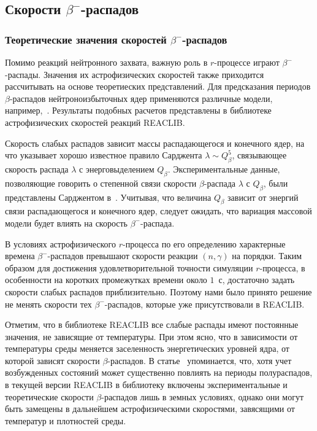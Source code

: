 \subsection{Скорости $\beta^-$-распадов} \label{sec:weakfit}
\subsubsection{Теоретические значения скоростей $\beta^-$-распадов}
  Помимо реакций нейтронного захвата, важную роль в $r$-процессе играют $\beta^-$-распады. Значения их астрофизических скоростей также приходится рассчитывать на основе теоретиеских представлений. Для предсказания периодов $\beta$-распадов нейтроноизбыточных ядер применяются различные модели, например,~\cite{moller2003}. Результаты подобных расчетов представлены в библиотеке астрофизических скоростей реакций REACLIB. 

  Скорость слабых распадов зависит массы распадающегося и конечного ядер, на что указывает хорошо известное правило Сарджента $\lambda \sim Q_\beta^5$, связывающее скорость распада $\lambda$ с энерговыделением $Q_\beta$. Экспериментальные данные, позволяющие говорить о степенной связи скорости $\beta$-распада $\lambda$ с $Q_\beta$, были представлены Сарджентом в~\cite{sargent1933}. Учитывая, что величина $Q_\beta$ зависит от энергий связи распадающегося и конечного ядер, следует ожидать, что вариация массовой модели будет влиять на скорость $\beta^-$-распада.

  В условиях астрофизического $r$-процесса по его определению характерные времена $\beta^-$-распадов превышают скорости реакции $(n,\gamma)$ на порядки. Таким образом для достижения удовлетворительной точности симуляции $r$-процесса, в особенности на коротких промежутках времени около $1$~с, достаточно задать скорости слабых распадов приблизительно. Поэтому нами было принято решение не менять скорости тех $\beta^-$-распадов, которые уже присутствовали в REACLIB.

  Отметим, что в библиотеке REACLIB все слабые распады имеют постоянные значения, не зависящие от температуры. При этом ясно, что в зависимости от температуры среды меняется заселенность энергетических уровней ядра, от которой зависят скорости $\beta$-распадов. В статье~\cite{reaclib2010} упоминается, что, хотя учет возбужденных состояний может существенно повлиять на периоды полураспадов, в текущей версии REACLIB в библиотеку включены экспериментальные и теоретические скорости $\beta$-распадов лишь в земных условиях, однако они могут быть замещены в дальнейшем астрофизическими скоростями, завясящими от температур и плотностей среды.

